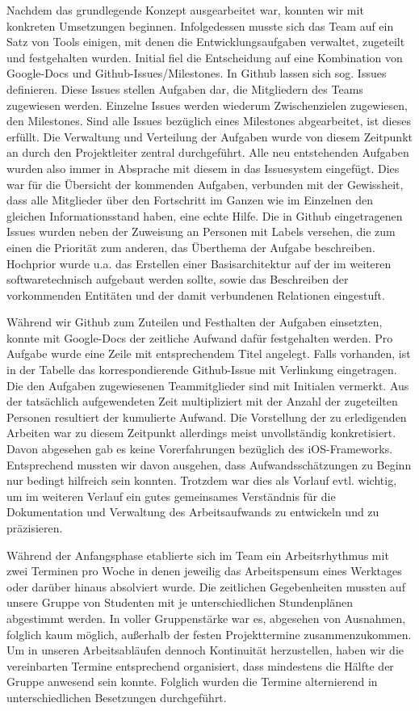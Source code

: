 	Nachdem das grundlegende Konzept ausgearbeitet war, konnten wir mit konkreten Umsetzungen beginnen. Infolgedessen musste sich das Team auf ein Satz von Tools einigen, mit denen die Entwicklungsaufgaben verwaltet, zugeteilt und festgehalten wurden. Initial fiel die Entscheidung auf eine Kombination von Google-Docs und Github-Issues/Milestones. In Github lassen sich sog. Issues definieren. Diese Issues stellen Aufgaben dar, die Mitgliedern des Teams zugewiesen werden. Einzelne Issues werden wiederum Zwischenzielen zugewiesen, den Milestones. Sind alle Issues bezüglich eines Milestones abgearbeitet, ist dieses erfüllt. Die Verwaltung und Verteilung der Aufgaben wurde von diesem Zeitpunkt an durch den Projektleiter zentral durchgeführt. Alle neu entstehenden Aufgaben wurden also immer in Absprache mit diesem in das Issuesystem eingefügt. Dies war für die Übersicht der kommenden Aufgaben, verbunden mit der Gewissheit, dass alle Mitglieder über den Fortschritt im Ganzen wie im Einzelnen den gleichen Informationsstand haben, eine echte Hilfe. Die in Github eingetragenen Issues wurden neben der Zuweisung an Personen mit Labels versehen, die zum einen die Priorität zum anderen, das Überthema der Aufgabe beschreiben. Hochprior wurde u.a. das Erstellen einer Basisarchitektur auf der im weiteren softwaretechnisch aufgebaut werden sollte, sowie das Beschreiben der vorkommenden Entitäten und der damit verbundenen Relationen eingestuft. 

	Während wir Github zum Zuteilen und Festhalten der Aufgaben einsetzten, konnte mit Google-Docs der zeitliche Aufwand dafür festgehalten werden. Pro Aufgabe wurde eine Zeile mit entsprechendem Titel angelegt. Falls vorhanden, ist in der Tabelle das korrespondierende Github-Issue mit Verlinkung eingetragen. Die den Aufgaben zugewiesenen Teammitglieder sind mit Initialen vermerkt. Aus der tatsächlich aufgewendeten Zeit multipliziert mit der Anzahl der zugeteilten Personen resultiert der kumulierte Aufwand. Die Vorstellung der zu erledigenden Arbeiten war zu diesem Zeitpunkt allerdings meist unvollständig konkretisiert. Davon abgesehen gab es keine Vorerfahrungen bezüglich des iOS-Frameworks. Entsprechend mussten wir davon ausgehen, dass Aufwandsschätzungen zu Beginn nur bedingt hilfreich sein konnten. Trotzdem war dies als Vorlauf evtl. wichtig, um im  weiteren Verlauf ein gutes gemeinsames Verständnis für die Dokumentation und Verwaltung des Arbeitsaufwands zu entwickeln und zu präzisieren. 

	Während der Anfangsphase etablierte sich im Team ein Arbeitsrhythmus mit zwei Terminen pro Woche in denen jeweilig das Arbeitspensum eines Werktages oder darüber hinaus absolviert wurde.  Die zeitlichen Gegebenheiten mussten auf unsere Gruppe von Studenten mit je unterschiedlichen Stundenplänen abgestimmt werden. In voller Gruppenstärke war es, abgesehen von Ausnahmen, folglich kaum möglich, außerhalb der festen Projekttermine zusammenzukommen. Um in unseren Arbeitsabläufen dennoch Kontinuität herzustellen, haben wir die vereinbarten Termine entsprechend organisiert, dass mindestens die Hälfte der Gruppe anwesend sein konnte. Folglich wurden die Termine alternierend in unterschiedlichen Besetzungen durchgeführt. 

